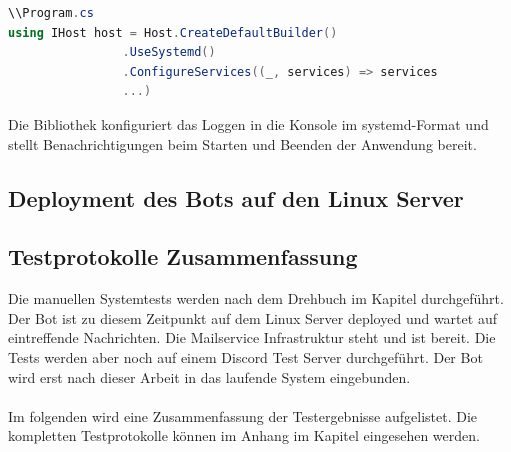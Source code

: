 \documentclass[a4paper, table]{article}
\begin{document}
\begin{lstlisting}[language=csharp]
\\Program.cs
using IHost host = Host.CreateDefaultBuilder()
                .UseSystemd()
                .ConfigureServices((_, services) => services
                ...)
\end{lstlisting}

Die Bibliothek konfiguriert das Loggen in die Konsole im systemd-Format und stellt Benachrichtigungen beim Starten und Beenden der Anwendung bereit.

\newpage
\subsection{Deployment des Bots auf den Linux Server}


\newpage
\subsection{Testprotokolle Zusammenfassung}
Die manuellen Systemtests werden nach dem Drehbuch im Kapitel  durchgeführt.
Der Bot ist zu diesem Zeitpunkt auf dem Linux Server deployed und wartet auf eintreffende Nachrichten. 
Die Mailservice Infrastruktur steht und ist bereit.
Die Tests werden aber noch auf einem Discord Test Server durchgeführt.
Der Bot wird erst nach dieser Arbeit in das laufende System eingebunden.\\\\
Im folgenden wird eine Zusammenfassung der Testergebnisse aufgelistet.
Die kompletten Testprotokolle können im Anhang im Kapitel  eingesehen werden.
\end{document}
